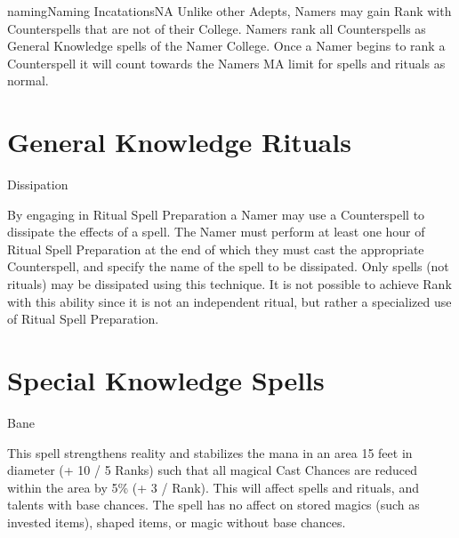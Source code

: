 \begin{College}[2.0]{naming}{Naming Incatations}{NA}
Unlike other Adepts, Namers may gain Rank with Counterspells that are
not of their College. Namers rank all Counterspells as General
Knowledge spells of the Namer College.  Once a Namer begins to rank a
Counterspell it will count towards the Namers MA limit for spells and
rituals as normal.


\section{General Knowledge Rituals}

\begin{ritual}[Q-1]{Dissipation}

\begin{effects}
By engaging in Ritual Spell Preparation a Namer may use a Counterspell
to dissipate the effects of a spell. The Namer must perform at least
one hour of Ritual Spell Preparation at the end of which they must
cast the appropriate Counterspell, and specify the name of the spell
to be dissipated.  Only spells (not rituals) may be dissipated using
this technique.  It is not possible to achieve Rank with this ability
since it is not an independent ritual, but rather a specialized use of
Ritual Spell Preparation.
\end{effects}
\end{ritual}

\section{Special Knowledge Spells}

\begin{spell}[S-1]{Bane}

\begin{effects}
This spell strengthens reality and stabilizes the mana in an area 15
feet in diameter (+ 10 / 5 Ranks) such that all magical Cast Chances
are reduced within the area by 5\% (+ 3 / Rank).  This will affect
spells and rituals, and talents with base chances.  The spell has no
affect on stored magics (such as invested items), shaped items, or
magic without base chances.
\end{effects}
\end{spell}


\end{College}
